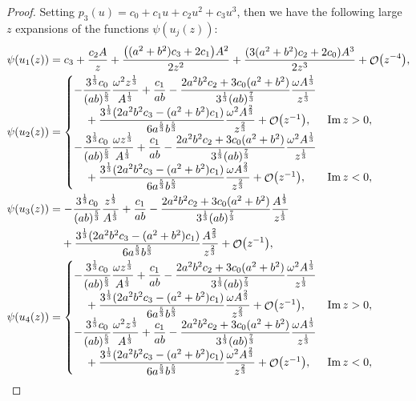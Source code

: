 \documentclass[pdftex]{sigma}
\DeclareMathOperator{\OO}{\mathcal{O}}
\numberwithin{equation}{section}
\begin{document}
\begin{proof}
Setting $p_3(u) = c_0 + c_1 u + c_2 u^2 + c_3u^3$, then we have the following large $z$ expansions of the
functions $\psi(u_j(z))$:
 \begin{align*}
 &\psi (u_1(z)) = c_3 + \frac{c_2 A}{z} + \frac{\bigl((a^2+b^2)c_3 + 2c_1\bigr)A^2}{2z^2} + \frac{(3(a^2 + b^2)c_2 + 2c_0)A^3}{2z^3} + \OO\bigl(z^{-4}\bigr),\\
 &\psi (u_2(z)) =
 \begin{cases}
 -\dfrac{ 3^{\frac{1}{3}} c_0}{(ab)^{\frac{5}{3}}} \dfrac{\omega^2z^{\frac{1}{3}}}{A^{\frac{1}{3}}} + \dfrac{c_1}{ab} - \dfrac{2a^2b^2c_2 + 3c_0(a^2+b^2)}{3^{\frac{1}{3}}(ab)^{\frac{7}{3}}} \dfrac{\omega A^{\frac{1}{3}}}{ z^{\frac{1}{3}}}&\\
 \quad{} + \dfrac{3^{\frac{1}{3}}(2a^2b^2c_3 - (a^2 + b^2)c_1)}{6a^{\frac{5}{3}}b^{\frac{5}{3}}} \dfrac{\omega^2A^{\frac{2}{3}}}{z^{\frac{2}{3}}} + \OO\bigl(z^{-1}\bigr), &\operatorname{Im}z >0,\\
 -\dfrac{ 3^{\frac{1}{3}} c_0}{(ab)^{\frac{5}{3}}} \dfrac{\omega z^{\frac{1}{3}}}{A^{\frac{1}{3}}} + \dfrac{c_1}{ab} - \dfrac{2a^2b^2c_2 + 3c_0(a^2+b^2)}{3^{\frac{1}{3}}(ab)^{\frac{7}{3}}} \dfrac{\omega^2A^{\frac{1}{3}}}{ z^{\frac{1}{3}}} &\\
 \quad{}+ \dfrac{3^{\frac{1}{3}}(2a^2b^2c_3 - (a^2 + b^2)c_1)}{6a^{\frac{5}{3}}b^{\frac{5}{3}}} \dfrac{\omega A^{\frac{2}{3}}}{z^{\frac{2}{3}}} + \OO\bigl(z^{-1}\bigr), &\operatorname{Im}z <0,
 \end{cases}\\
 &\psi(u_3(z)) = -\frac{ 3^{\frac{1}{3}} c_0}{(ab)^{\frac{5}{3}}} \frac{z^{\frac{1}{3}}}{A^{\frac{1}{3}}} + \frac{c_1}{ab} - \frac{2a^2b^2c_2 + 3c_0(a^2+b^2)}{3^{\frac{1}{3}}(ab)^{\frac{7}{3}}} \frac{A^{\frac{1}{3}}}{z^{\frac{1}{3}}}\\
 &\hphantom{\psi(u_3(z)) =}{}
 + \frac{3^{\frac{1}{3}}(2a^2b^2c_3 - (a^2 + b^2)c_1)}{6a^{\frac{5}{3}}b^{\frac{5}{3}}} \frac{A^{\frac{2}{3}}}{z^{\frac{2}{3}}} + \OO\bigl(z^{-1}\bigr),\\
 &\psi(u_4(z)) =
 \begin{cases}
 -\dfrac{ 3^{\frac{1}{3}} c_0}{(ab)^{\frac{5}{3}}} \dfrac{\omega z^{\frac{1}{3}}}{A^{\frac{1}{3}}} + \dfrac{c_1}{ab} - \dfrac{2a^2b^2c_2 + 3c_0(a^2+b^2)}{3^{\frac{1}{3}}(ab)^{\frac{7}{3}}} \dfrac{\omega^2A^{\frac{1}{3}}}{ z^{\frac{1}{3}}} &\\
 \quad{}+ \dfrac{3^{\frac{1}{3}}(2a^2b^2c_3 - (a^2 + b^2)c_1)}{6a^{\frac{5}{3}}b^{\frac{5}{3}}} \dfrac{\omega A^{\frac{2}{3}}}{z^{\frac{2}{3}}} + \OO\bigl(z^{-1}\bigr), &\operatorname{Im}z >0,\\
 -\dfrac{ 3^{\frac{1}{3}} c_0}{(ab)^{\frac{5}{3}}} \dfrac{\omega^2z^{\frac{1}{3}}}{A^{\frac{1}{3}}} + \dfrac{c_1}{ab} - \dfrac{2a^2b^2c_2 + 3c_0(a^2+b^2)}{3^{\frac{1}{3}}(ab)^{\frac{7}{3}}} \dfrac{\omega A^{\frac{1}{3}}}{ z^{\frac{1}{3}}} &\\
 \quad{}+ \dfrac{3^{\frac{1}{3}}(2a^2b^2c_3 - (a^2 + b^2)c_1)}{6a^{\frac{5}{3}}b^{\frac{5}{3}}} \dfrac{\omega^2A^{\frac{2}{3}}}{z^{\frac{2}{3}}} + \OO\bigl(z^{-1}\bigr), &\operatorname{Im}z <0,
 \end{cases}
 \end{align*}


\end{proof}
\end{document}
